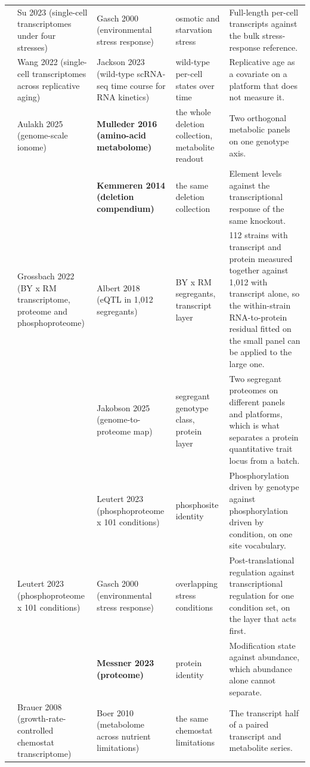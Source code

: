 \begin{landscape}
\begin{longtable}{@{}r@{\hspace{4pt}} L{42mm} L{44mm} L{48mm} L{96mm}@{}}
 & Su 2023 (single-cell transcriptomes under four stresses) & Gasch 2000 (environmental stress response) & osmotic and starvation stress & Full-length per-cell transcripts against the bulk stress-response reference. \\
 & Wang 2022 (single-cell transcriptomes across replicative aging) & Jackson 2023 (wild-type scRNA-seq time course for RNA kinetics) & wild-type per-cell states over time & Replicative age as a covariate on a platform that does not measure it. \\
 & Aulakh 2025 (genome-scale ionome) & \textbf{Mulleder 2016 (amino-acid metabolome)} & the whole deletion collection, metabolite readout & Two orthogonal metabolic panels on one genotype axis. \\
 &  & \textbf{Kemmeren 2014 (deletion compendium)} & the same deletion collection & Element levels against the transcriptional response of the same knockout. \\
 & Grossbach 2022 (BY x RM transcriptome, proteome and phosphoproteome) & Albert 2018 (eQTL in 1,012 segregants) & BY x RM segregants, transcript layer & 112 strains with transcript and protein measured together against 1,012 with transcript alone, so the within-strain RNA-to-protein residual fitted on the small panel can be applied to the large one. \\
 &  & Jakobson 2025 (genome-to-proteome map) & segregant genotype class, protein layer & Two segregant proteomes on different panels and platforms, which is what separates a protein quantitative trait locus from a batch. \\
 &  & Leutert 2023 (phosphoproteome x 101 conditions) & phosphosite identity & Phosphorylation driven by genotype against phosphorylation driven by condition, on one site vocabulary. \\
 & Leutert 2023 (phosphoproteome x 101 conditions) & Gasch 2000 (environmental stress response) & overlapping stress conditions & Post-translational regulation against transcriptional regulation for one condition set, on the layer that acts first. \\
 &  & \textbf{Messner 2023 (proteome)} & protein identity & Modification state against abundance, which abundance alone cannot separate. \\
 & Brauer 2008 (growth-rate-controlled chemostat transcriptome) & Boer 2010 (metabolome across nutrient limitations) & the same chemostat limitations & The transcript half of a paired transcript and metabolite series. \\

\end{longtable}
\end{landscape}
